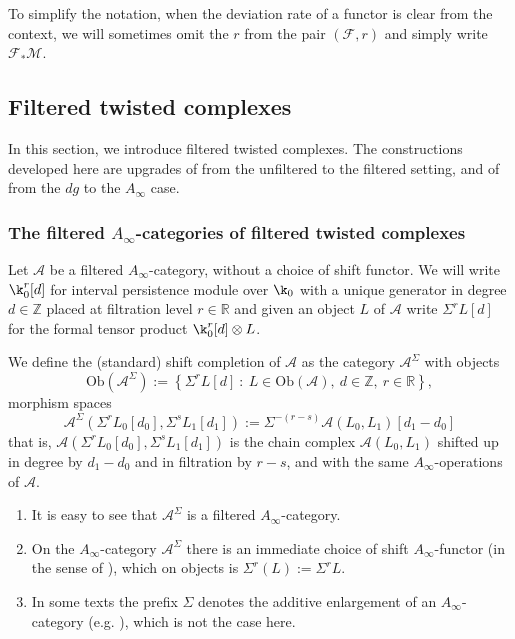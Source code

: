To simplify the notation, when the deviation rate of a functor is
clear from the context, we will sometimes omit the $r$ from the pair
$(\mathcal{F}, r)$ and simply write $\mathcal{F}_* \mathcal{M}$.

\subsection{Filtered twisted complexes}\label{ap:ftc} In this section, we introduce filtered twisted complexes. The constructions developed here are upgrades of \cite[Chapter 3]{Se:book-fukaya-categ} from the unfiltered to the filtered setting, and of \cite[Section 2.5.1]{BCZ:tpc} from the $dg$ to the $A_\infty$ case.
\subsubsection{The filtered $A_\infty$-categories of filtered twisted complexes} Let $\mathcal{A}$ be a filtered $A_\infty$-category, without a choice of shift functor.
We will write $\k_0^r[d]$ for interval persistence module over $\k_0$ with a unique generator in degree $d\in \mathbb Z$ placed at filtration level $r\in \mathbb R$ and given an object $L$ of $\mathcal{A}$ write $\Sigma^rL[d]$ for the formal tensor product $\k_0^r[d]\otimes L$. 
\begin{dfn}
	We define the (standard) shift completion of $\mathcal{A}$ as the category $\mathcal{A}^\Sigma$ with objects $$\text{Ob}(\mathcal{A}^\Sigma) := \left\{ \Sigma^rL[d]\ : \ L\in \text{Ob}(\mathcal{A}), \ d\in \mathbb{Z}, \ r\in \mathbb R \right\},$$ morphism spaces $$\mathcal{A}^\Sigma(\Sigma^rL_0[d_0],\Sigma^sL_1[d_1]) := \Sigma^{-(r-s)}\mathcal{A}(L_0,L_1)[d_1-d_0]$$ that is, $\mathcal{A}(\Sigma^rL_0[d_0],\Sigma^sL_1[d_1]) $ is the chain complex $\mathcal{A}(L_0,L_1)$ shifted up in degree by $d_1-d_0$ and in filtration by $r-s$, and with the same $A_\infty$-operations of $\mathcal{A}$.
\end{dfn}
\begin{rem}
	\begin{enumerate}
		\item It is easy to see that $\mathcal{A}^\Sigma$ is a filtered $A_\infty$-category. 
		\item On the $A_\infty$-category $\mathcal{A}^\Sigma$ there is an immediate choice of shift $A_\infty$-functor (in the sense of \cite[Section 3.2.1]{BCZ:tpc}), which on objects is $\Sigma^r(L) := \Sigma^rL$. %
		\item In some texts the prefix $\Sigma$ denotes the additive enlargement of an $A_\infty$-category (e.g. \cite[Section (3k)]{Se:book-fukaya-categ}), which is not the case here.
	\end{enumerate}
\end{rem}
